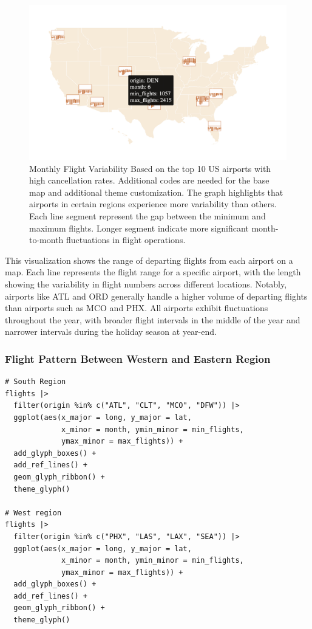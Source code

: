 \begin{figure}

{\centering \includegraphics[width=1\linewidth]{figures/monthly-flight-variability} 

}

\caption{Monthly Flight Variability Based on the top 10 US airports with high cancellation rates. Additional codes are needed for the base map and additional theme customization. The graph highlights that airports in certain regions experience more variability than others. Each line segment represent the gap between the minimum and maximum flights. Longer segment indicate more significant month-to-month fluctuations in flight operations.}\label{fig:unnamed-chunk-24}
\end{figure}

This visualization shows the range of departing flights from each airport on a map. Each line represents the flight range for a specific airport, with the length showing the variability in flight numbers across different locations. Notably, airports like ATL and ORD generally handle a higher volume of departing flights than airports such as MCO and PHX. All airports exhibit fluctuations throughout the year, with broader flight intervals in the middle of the year and narrower intervals during the holiday season at year-end.

\hypertarget{flight-pattern-between-western-and-eastern-region}{%
\subsubsection{Flight Pattern Between Western and Eastern Region}\label{flight-pattern-between-western-and-eastern-region}}

\begin{verbatim}
# South Region
flights |> 
  filter(origin %in% c("ATL", "CLT", "MCO", "DFW")) |>
  ggplot(aes(x_major = long, y_major = lat,
             x_minor = month, ymin_minor = min_flights,
             ymax_minor = max_flights)) + 
  add_glyph_boxes() +
  add_ref_lines() +
  geom_glyph_ribbon() +
  theme_glyph()

# West region
flights |> 
  filter(origin %in% c("PHX", "LAS", "LAX", "SEA")) |>
  ggplot(aes(x_major = long, y_major = lat,
             x_minor = month, ymin_minor = min_flights,
             ymax_minor = max_flights)) + 
  add_glyph_boxes() +
  add_ref_lines() +
  geom_glyph_ribbon() +
  theme_glyph()
\end{verbatim}

